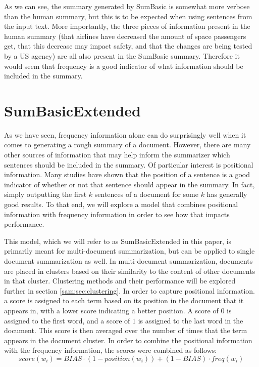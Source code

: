 \documentclass[../writeup.tex]{subfiles}
\begin{document}
As we can see, the summary generated by SumBasic is somewhat more verbose than the human summary, but this is to be expected when using sentences from the input text.
More importantly, the three pieces of information present in the human summary (that airlines have decreased the amount of space passengers get, that this decrease may impact safety, and that the changes are being tested by a US agency) are all also present in the SumBasic summary.
Therefore it would seem that frequency is a good indicator of what information should be included in the summary.

\section{SumBasicExtended}\label{sam:sec:sum_basic_extended}
As we have seen, frequency information alone can do surprisingly well when it comes to generating a rough summary of a document.
However, there are many other sources of information that may help inform the summarizer which sentences should be included in the summary.
Of particular interest is positional information.
Many studies have shown that the position of a sentence is a good indicator of whether or not that sentence should appear in the summary.
In fact, simply outputting the first $k$ sentences of a document for some $k$ has generally good results.\autocite*[]{sumbasic-extended}
To that end, we will explore a model that combines positional information with frequency information in order to see how that impacts performance.

This model, which we will refer to as SumBasicExtended in this paper, is primarily meant for multi-document summarization, but can be applied to single document summarization as well.
In multi-document summarization, documents are placed in clusters based on their similarity to the content of other documents in that cluster.
Clustering methods and their performance will be explored further in section \ref{sam:sec:clustering}.
In order to capture positional information. a score is assigned to each term based on its position in the document that it appears in, with a lower score indicating a better position.
A score of $0$ is assigned to the first word, and a score of $1$ is assigned to the last word in the document.
This score is then averaged over the number of times that the term appears in the document cluster.
In order to combine the positional information with the frequency information, the scores were combined as follows:
\begin{equation}\label{sam:eq:extended_summary_score}
    score(w_i) = BIAS \cdot (1 - position(w_i)) + (1-BIAS) \cdot freq(w_i)
\end{equation}
\end{document}
